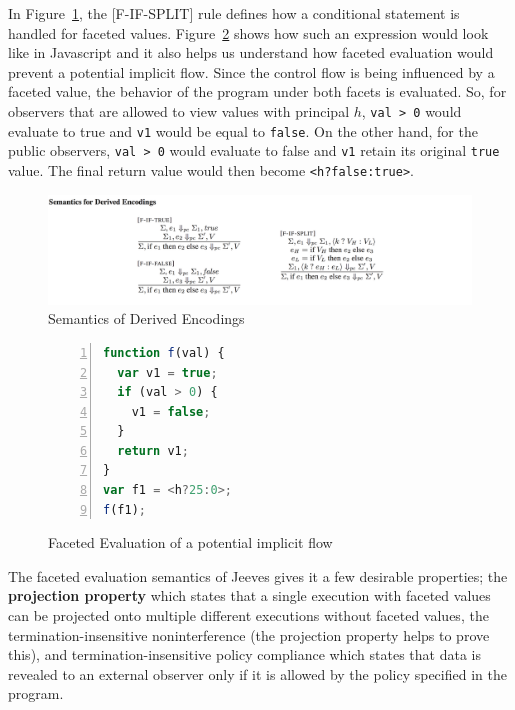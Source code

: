 In Figure~\ref{fig:fif}, the [F-IF-SPLIT] rule defines how a conditional statement
is handled for faceted values. Figure~\ref{fig:implicit flow} shows how such an
expression would look like in Javascript and it also helps us understand how faceted
evaluation would prevent a potential implicit flow. Since the control flow is being
influenced by a faceted value, the behavior of the program under both facets is
evaluated. So, for observers that are allowed to view values with principal
$h$, \texttt{val > 0} would evaluate to true and \texttt{v1} would be equal to
\texttt{false}. On the other hand, for the public observers, \texttt{val > 0} would
evaluate to false and \texttt{v1} retain its original \texttt{true} value. The final
return value would then become \texttt{<h?false:true>}.

\begin{figure}
	\centering
	\includegraphics[scale=0.275, frame]{images/fif.png}
	\caption{Semantics of Derived Encodings~\cite{FacetedJeeves}}
	\label{fig:fif}
\end{figure}

\begin{figure}
	\begin{lstlisting}[language=javascript,frame=single, breaklines=true,basicstyle=\footnotesize\ttfamily, numbers=left, extendedchars=true, tabsize=2]
function f(val) {
  var v1 = true;
  if (val > 0) {
    v1 = false;
  }
  return v1;
}
var f1 = <h?25:0>;
f(f1);
\end{lstlisting}
\caption{Faceted Evaluation of a potential implicit flow}
\label{fig:implicit flow}
\end{figure}

The faceted evaluation semantics of Jeeves gives it a few desirable properties;
the \textbf{projection property} which states that a single execution with faceted
values can be projected onto multiple different executions without faceted values,
the termination-insensitive noninterference (the projection property helps to prove
this), and termination-insensitive policy compliance which states that data is revealed
to an external observer only if it is allowed by the policy specified in the program.

